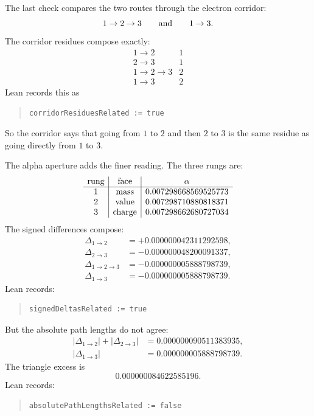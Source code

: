 The last check compares the two routes through the electron corridor:
\[
  1\to2\to3
  \qquad\hbox{and}\qquad
  1\to3.
\]
The corridor residues compose exactly:
\[
\begin{array}{l|r}
1\to2 & 1\\
2\to3 & 1\\
1\to2\to3 & 2\\
1\to3 & 2
\end{array}
\]
Lean records this as
\begin{quote}\small
\begin{verbatim}
corridorResiduesRelated := true
\end{verbatim}
\end{quote}
So the corridor says that going from \(1\) to \(2\) and then \(2\) to \(3\) is the same residue as going directly
from \(1\) to \(3\).

The alpha aperture adds the finer reading. The three rungs are:
\[
\begin{array}{c|c|c}
\hbox{rung} & \hbox{face} & \alpha\\
\hline
1 & \hbox{mass} & 0.007298668569525773\\
2 & \hbox{value} & 0.007298710880818371\\
3 & \hbox{charge} & 0.007298662680727034
\end{array}
\]
The signed differences compose:
\[
\begin{aligned}
  \Delta_{1\to2} &= +0.000000042311292598,\\
  \Delta_{2\to3} &= -0.000000048200091337,\\
  \Delta_{1\to2\to3} &= -0.000000005888798739,\\
  \Delta_{1\to3} &= -0.000000005888798739.
\end{aligned}
\]
Lean records:
\begin{quote}\small
\begin{verbatim}
signedDeltasRelated := true
\end{verbatim}
\end{quote}
But the absolute path lengths do not agree:
\[
\begin{aligned}
  |\Delta_{1\to2}|+|\Delta_{2\to3}|
    &= 0.000000090511383935,\\
  |\Delta_{1\to3}|
    &= 0.000000005888798739.
\end{aligned}
\]
The triangle excess is
\[
  0.000000084622585196.
\]
Lean records:
\begin{quote}\small
\begin{verbatim}
absolutePathLengthsRelated := false
\end{verbatim}
\end{quote}

